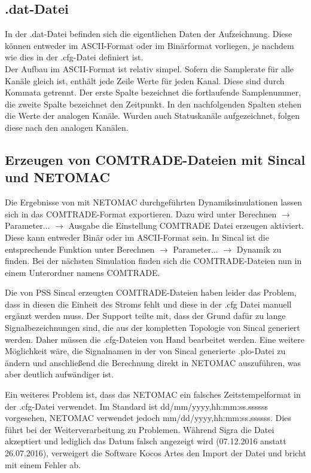 \documentclass{scrartcl}
\begin{document}
\begin{onehalfspace}
\subsection{.dat-Datei}
In der .dat-Datei befinden sich die eigentlichen Daten der Aufzeichnung. Diese können entweder im ASCII-Format oder im Binärformat vorliegen, je nachdem wie dies in der .cfg-Datei definiert ist. \\
Der Aufbau im ASCII-Format ist relativ simpel. Sofern die Samplerate für alle Kanäle gleich ist, enthält jede Zeile Werte für jeden Kanal. Diese sind durch Kommata getrennt. Der erste Spalte bezeichnet die fortlaufende Samplenummer, die zweite Spalte bezeichnet den Zeitpunkt. In den nachfolgenden Spalten stehen die Werte der analogen Kanäle. Wurden auch Statuskanäle aufgezeichnet, folgen diese nach den analogen Kanälen.

\subsection{Erzeugen von COMTRADE-Dateien mit Sincal und NETOMAC}
Die Ergebnisse von mit NETOMAC durchgeführten Dynamiksimulationen lassen sich in das COMTRADE-Format exportieren. Dazu wird unter Berechnen $\rightarrow$ Parameter... $\rightarrow$ Ausgabe die Einstellung \glqq COMTRADE Datei erzeugen\grqq{} aktiviert. Diese kann entweder Binär oder im ASCII-Format sein. In Sincal ist die entsprechende Funktion unter Berechnen $\rightarrow$ Parameter... $\rightarrow$ Dynamik zu finden. Bei der nächsten Simulation finden sich die COMTRADE-Dateien nun in einem Unterordner namens COMTRADE.

Die von PSS Sincal erzeugten COMTRADE-Dateien haben leider das Problem, dass in diesen die Einheit des Stroms fehlt und diese in der .cfg Datei manuell ergänzt werden muss. Der Support teilte mit, dass der Grund dafür zu lange Signalbezeichnungen sind, die aus der kompletten Topologie von Sincal generiert werden. Daher müssen die .cfg-Dateien von Hand bearbeitet werden. Eine weitere Möglichkeit wäre, die Signalnamen in der von Sincal generierte .plo-Datei zu ändern und anschließend die Berechnung direkt in NETOMAC auszuführen, was aber deutlich aufwändiger ist.

Ein weiteres Problem ist, dass das NETOMAC ein falsches Zeitstempelformat in der .cfg-Datei verwendet. Im Standard ist dd/mm/yyyy,hh:mm:ss.ssssss vorgesehen, NETOMAC verwendet jedoch mm/dd/yyyy,hh:mm:ss.ssssss. Dies führt bei der Weiterverarbeitung zu Problemen. Während Sigra die Datei akzeptiert und lediglich das Datum falsch angezeigt wird (07.12.2016 anstatt 26.07.2016), verweigert die Software Kocos Artes den Import der Datei und bricht mit einem Fehler ab.


\end{onehalfspace}
\end{document}
